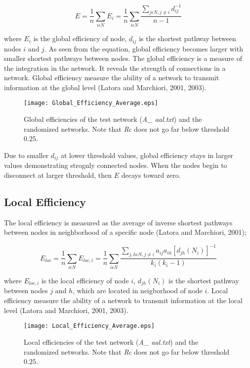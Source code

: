 \documentclass[12pt]{article}
\begin{document}
\begin{equation}
E = \frac{1}{n}\sum\limits_{i \epsilon N} E_i = \frac{1}{n}\sum\limits_{i \epsilon N} \frac{\sum\limits_{j \epsilon N, j\neq i}d_{ij}^{-1}}{n-1 }
\end{equation}

where $E_i$ is the global efficiency of node, $d_{ij}$ is the shortest pathway between nodes $i$ and $j$. As seen from the equation, global efficiency becomes larger with smaller shortest pathways between nodes. The global efficiency is a measure of the integration in the network. It reveals the strength of connections in a network. Global efficiency measure the ability of a network to transmit information at the global level (Latora and Marchiori, 2001, 2003).

\begin{figure}[h!]
	\centering
	\texttt{[image: Global\_Efficiency\_Average.eps]}
	\caption{Global efficiencies of the test network (\textit{A\_ aal.txt}) and the randomized networks. Note that \textit{Rc} does not go far below threshold $0.25$.}
\end{figure}

Due to smaller $d_{ij}$ at lower threshold values, global efficiency stays in larger values demonstrating strognly connected nodes. When the nodes begin to disconnect at larger threshold, then $E$ decays toward zero.

\newpage

\subsection{Local Efficiency}
The local efficiency is measured as the average of inverse shortest pathways between nodes in neighborhood of a specific node (Latora and Marchiori, 2001);

\begin{equation}
E_{loc} = \frac{1}{n}\sum\limits_{i \epsilon N} E_{loc,i} = \frac{1}{n}\sum\limits_{i \epsilon N} \frac{\sum\limits_{j,h \epsilon N, j\neq i} a_{ij} a_{ih}[d_{jh}(N_i)]^{-1}}{k_i(k_i - 1) }
\end{equation}

where $E_{loc,i}$ is the local efficiency of node $i$, $d_{jh}(N_i)$ is the shortest pathway between nodes $j$ and $h$, which are located in neigborhood of node $i$. Local efficiency measure the ability of a network to transmit information at the local level (Latora and Marchiori, 2001, 2003).

\begin{figure}[h!]
	\centering
	\texttt{[image: Local\_Efficiency\_Average.eps]}
	\caption{Local efficiencies of the test network (\textit{A\_ aal.txt}) and the randomized networks. Note that \textit{Rc} does not go far below threshold $0.25$.}
\end{figure}
\end{document}
